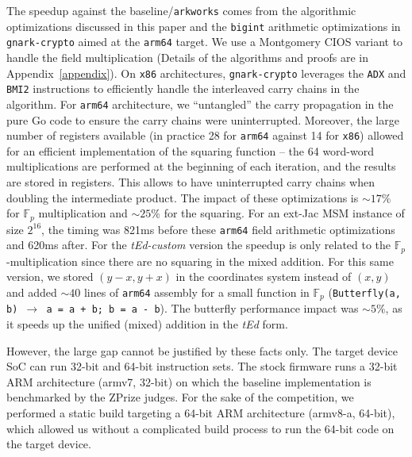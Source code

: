 \documentclass[journal=tches,spthm]{iacrtrans}
\newcommand{\F}{\ensuremath{\mathbb F}}
\begin{document}
The speedup against the baseline/\texttt{arkworks} comes from the algorithmic optimizations
discussed in this paper and the \texttt{bigint} arithmetic optimizations in
\texttt{gnark-crypto} aimed at the \texttt{arm64} target. We use a Montgomery
CIOS variant to handle the field multiplication (Details of the algorithms and
proofs are in Appendix~\ref{appendix}).
On \texttt{x86} architectures, \texttt{gnark-crypto} leverages the \texttt{ADX} and \texttt{BMI2}
instructions to efficiently handle the interleaved carry chains in the
algorithm. For \texttt{arm64} architecture, we ``untangled'' the carry
propagation in the pure Go code to ensure the carry chains were uninterrupted.
Moreover, the large number of registers available (in practice 28 for
\texttt{arm64} against 14 for \texttt{x86}) allowed for an efficient
implementation of the squaring function – the 64 word-word multiplications are
performed at the beginning of each iteration, and the results are stored in
registers. This allows to have uninterrupted carry chains when doubling the
intermediate product. The impact of these optimizations is $\sim 17\%$ for
$\F_p$ multiplication and $\sim 25\%$ for the squaring. For an ext-Jac MSM
instance of size $2^{16}$, the timing was 821ms before these \texttt{arm64}
field arithmetic optimizations and 620ms after. For the \textit{tEd-custom} version the
speedup is only related to the $\F_p$-multiplication since there are no squaring in the mixed addition.  For
this same version, we stored $(y-x, y+x)$ in the coordinates system instead of
$(x,y)$ and added $\sim 40$ lines of \texttt{arm64} assembly for a small
function in $\F_p$ (\texttt{Butterfly(a, b) $\rightarrow$ a = a + b; b = a -
b}). The butterfly performance impact was $\sim 5\%$, as it speeds up the unified (mixed)
addition in the \textit{tEd} form.

However, the large gap cannot be
justified by these facts only. The target device SoC can run 32-bit and 64-bit
instruction sets. The stock firmware runs a 32-bit ARM architecture
(armv7, 32-bit) on which the baseline implementation is benchmarked by the ZPrize
judges. For the sake of the competition, we performed a static build targeting
a 64-bit ARM architecture (armv8-a, 64-bit), which allowed us without a complicated build
process to run the 64-bit code on the target device.
\end{document}
